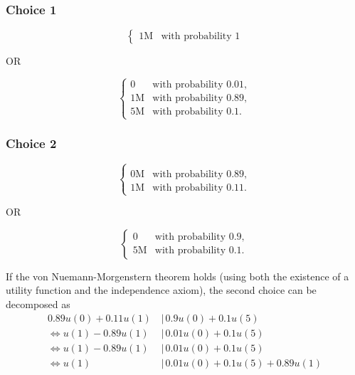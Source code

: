 \documentclass{article}
\begin{document}
\subsubsection{Choice 1}

\begin{equation*}
\left\{
\begin{array}{rl}
1\text{M} & \text{with probability } 1
\end{array} \right.
\end{equation*}

OR

\begin{equation*}
\left\{
\begin{array}{rl}
0 & \text{with probability } 0.01,
\\1\text{M} & \text{with probability } 0.89,
\\5\text{M} & \text{with probability } 0.1.
\end{array} \right.
\end{equation*}

\subsubsection{Choice 2}

\begin{equation*}
\left\{
\begin{array}{rl}
\\0\text{M} & \text{with probability } 0.89,
\\1\text{M} & \text{with probability } 0.11.
\end{array} \right.
\end{equation*}

OR

\begin{equation*}
\left\{
\begin{array}{rl}
0 & \text{with probability } 0.9,
\\5\text{M} & \text{with probability } 0.1.
\end{array} \right.
\end{equation*}

If the von Nuemann-Morgenstern theorem holds (using both the existence of a utility function and the independence axiom), the second choice can be decomposed as 
\begin{align*}
0.89u(0)+0.11u(1)\, &|\, 0.9u(0)+0.1u(5) \\
\Leftrightarrow u(1)-0.89u(1) \, &|\, 0.01u(0)+0.1u(5) \\
\Leftrightarrow u(1)-0.89u(1) \, &|\, 0.01u(0)+0.1u(5) \\
\Leftrightarrow u(1) \, &|\, 0.01u(0)+0.1u(5)+0.89u(1)
\end{align*}
\end{document}
